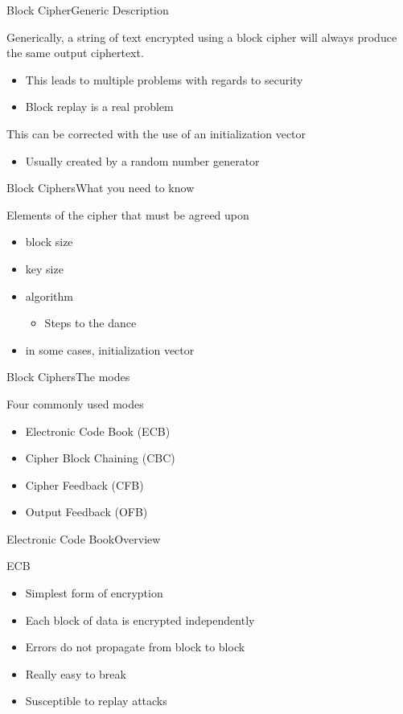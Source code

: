 \documentclass[12pt]{beamer}
\begin{document}
\begin{frame}{Block Cipher}{Generic Description}
\begin{block}{}
Generically, a string of text encrypted using a block cipher will always produce the same output ciphertext.
\begin{itemize}
	\item This leads to multiple problems with regards to security
	\item Block replay is a real problem
\end{itemize}
This can be corrected with the use of an initialization vector
\begin{itemize}
	\item Usually created by a random number generator
\end{itemize}
\end{block}
\end{frame}

\begin{frame}{Block Ciphers}{What you need to know}
\begin{block}{Elements of the cipher that must be agreed upon}
\begin{itemize}
	\item block size
	\item key size
	\item algorithm
	\begin{itemize}
		\item Steps to the dance
	\end{itemize}
	\item in some cases, initialization vector
\end{itemize}
\end{block}
\end{frame}

\begin{frame}{Block Ciphers}{The modes}
\begin{block}{Four commonly used modes}
\begin{itemize}
	\item Electronic Code Book (ECB)
	\item Cipher Block Chaining (CBC)
	\item Cipher Feedback (CFB)
	\item Output Feedback (OFB)
\end{itemize}
\end{block}
\end{frame}

\begin{frame}{Electronic Code Book}{Overview}
\begin{block}{ECB}
\begin{itemize}
	\item Simplest form of encryption
	\item Each block of data is encrypted independently
	\item Errors do not propagate from block to block
	\item Really easy to break
	\item Susceptible to replay attacks
\end{itemize}
\end{block}
\end{frame}
\end{document}

